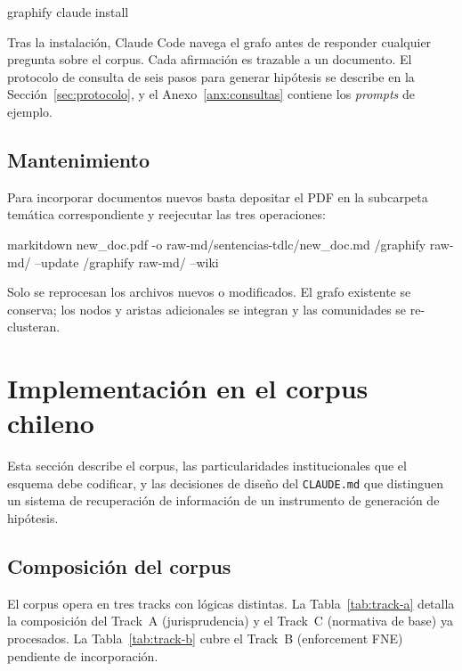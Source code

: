 \documentclass[12pt,a4paper]{article}
\begin{document}
\begin{codebox}
graphify claude install
\end{codebox}

Tras la instalación, Claude Code navega el grafo antes de responder cualquier
pregunta sobre el corpus. Cada afirmación es trazable a un documento.
El protocolo de consulta de seis pasos para generar hipótesis se describe
en la Sección~\ref{sec:protocolo}, y el Anexo~\ref{anx:consultas} contiene
los \emph{prompts} de ejemplo.

\subsection{Mantenimiento}

Para incorporar documentos nuevos basta depositar el PDF en la subcarpeta
temática correspondiente y reejecutar las tres operaciones:

\begin{codebox}
markitdown new_doc.pdf -o raw-md/sentencias-tdlc/new_doc.md
/graphify raw-md/ --update
/graphify raw-md/ --wiki
\end{codebox}

Solo se reprocesan los archivos nuevos o modificados. El grafo existente se
conserva; los nodos y aristas adicionales se integran y las comunidades se
re-clusteran.

\section{Implementación en el corpus chileno}
\label{sec:esquema}

Esta sección describe el corpus, las particularidades institucionales que el
esquema debe codificar, y las decisiones de diseño del \texttt{CLAUDE.md} que
distinguen un sistema de recuperación de información de un instrumento de
generación de hipótesis.

\subsection{Composición del corpus}

El corpus opera en tres tracks con lógicas distintas. La Tabla~\ref{tab:track-a}
detalla la composición del Track~A (jurisprudencia) y el Track~C (normativa de
base) ya procesados. La Tabla~\ref{tab:track-b} cubre el Track~B (enforcement
FNE) pendiente de incorporación.
\end{document}
